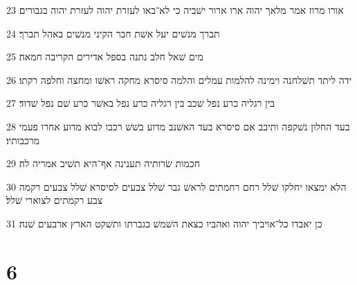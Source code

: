 \par 23 אורו מרוז אמר מלאך יהוה ארו ארור ישׁביה כי לא־באו לעזרת יהוה לעזרת יהוה בגבורים׃
\par 24 תברך מנשׁים יעל אשׁת חבר הקיני מנשׁים באהל תברך׃
\par 25 מים שׁאל חלב נתנה בספל אדירים הקריבה חמאה׃
\par 26 ידה ליתד תשׁלחנה וימינה להלמות עמלים והלמה סיסרא מחקה ראשׁו ומחצה וחלפה רקתו׃
\par 27 בין רגליה כרע נפל שׁכב בין רגליה כרע נפל באשׁר כרע שׁם נפל שׁדוד׃
\par 28 בעד החלון נשׁקפה ותיבב אם סיסרא בעד האשׁנב מדוע בשׁשׁ רכבו לבוא מדוע אחרו פעמי מרכבותיו׃
\par 29 חכמות שׂרותיה תענינה אף־היא תשׁיב אמריה לה׃
\par 30 הלא ימצאו יחלקו שׁלל רחם רחמתים לראשׁ גבר שׁלל צבעים לסיסרא שׁלל צבעים רקמה צבע רקמתים לצוארי שׁלל׃
\par 31 כן יאבדו כל־אויביך יהוה ואהביו כצאת השׁמשׁ בגברתו ותשׁקט הארץ ארבעים שׁנה׃

\chapter{6}

